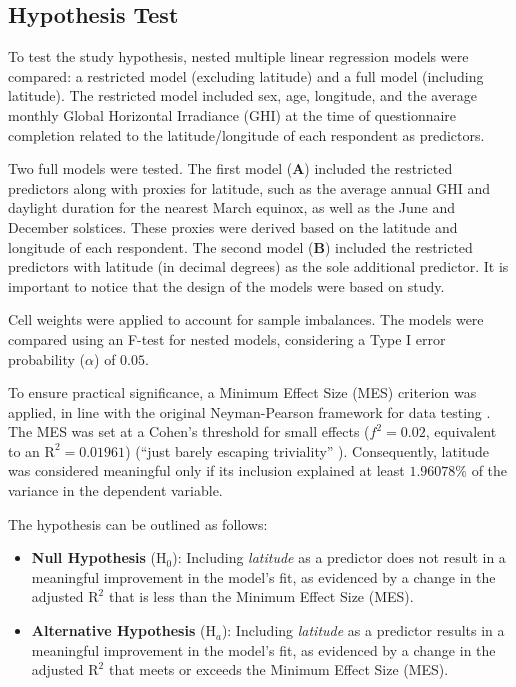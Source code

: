 \documentclass[
12pt,
openright,
oneside,
a4paper,
chapter=TITLE,
section=TITLE,
french,
spanish,
brazil,
english
]{abntex2}
\begin{document}
\subsection{Hypothesis Test}\label{hypothesis-test}

To test the study hypothesis, nested multiple linear regression models
were compared: a restricted model (excluding latitude) and a full model
(including latitude). The restricted model included sex, age, longitude,
and the average monthly Global Horizontal Irradiance (GHI) at the time
of questionnaire completion related to the latitude/longitude of each
respondent as predictors.

Two full models were tested. The first model (\textbf{A}) included the
restricted predictors along with proxies for latitude, such as the
average annual GHI and daylight duration for the nearest March equinox,
as well as the June and December solstices. These proxies were derived
based on the latitude and longitude of each respondent. The second model
(\textbf{B}) included the restricted predictors with latitude (in
decimal degrees) as the sole additional predictor. It is important to
notice that the design of the models were based on
\textcite{leocadio-miguel2017} study.

Cell weights were applied to account for sample imbalances. The models
were compared using an F-test for nested models, considering a Type I
error probability (\(\alpha\)) of \(0.05\).

To ensure practical significance, a Minimum Effect Size (MES) criterion
was applied, in line with the original Neyman-Pearson framework for data
testing \autocite{neyman1928,neyman1928a,perezgonzalez2015}. The MES was
set at a Cohen's threshold for small effects (\(f^2 = 0.02\), equivalent
to an \(\text{R}^2 = 0.01961\)) (``just barely escaping triviality''
\autocite[413]{cohen1988a}). Consequently, latitude was considered
meaningful only if its inclusion explained at least \(1.96078\%\) of the
variance in the dependent variable.

The hypothesis can be outlined as follows:

\begin{itemize}
\item
  \textbf{Null Hypothesis} (\(\text{H}_{0}\)): Including \emph{latitude}
  as a predictor does not result in a meaningful improvement in the
  model's fit, as evidenced by a change in the adjusted \(\text{R}^{2}\)
  that is less than the Minimum Effect Size (MES).
\item
  \textbf{Alternative Hypothesis} (\(\text{H}_{a}\)): Including
  \emph{latitude} as a predictor results in a meaningful improvement in
  the model's fit, as evidenced by a change in the adjusted
  \(\text{R}^{2}\) that meets or exceeds the Minimum Effect Size (MES).
\end{itemize}
\end{document}

